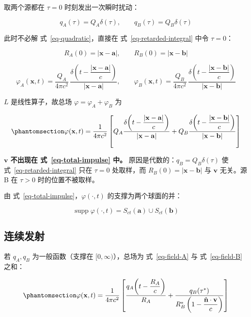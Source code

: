 \documentclass[
  chinese,
  a4paper,
  UTF8,
  12pt,
  oneside,
  openany]{ctexbook}
\theoremstyle{plain}
\theoremstyle{plain}
\theoremstyle{plain}
\theoremstyle{definition}
\theoremstyle{plain}
\theoremstyle{plain}
\theoremstyle{remark}
\begin{document}
取两个源都在 \(\tau=0\) 时刻发出一次瞬时扰动：

\[
q_{A}(\tau)=Q_{A}\delta(\tau),\qquad q_{B}(\tau)=Q_{B}\delta(\tau)
\]

此时不必解 式~\ref{eq-quadratic}，直接在 式~\ref{eq-retarded-integral}
中令 \(\tau=0\)：

\[
R_{A}(0)=|\mathbf{x}-\mathbf{a}|,\qquad R_{B}(0)=|\mathbf{x}-\mathbf{b}|
\]

\[
\varphi_{A}(\mathbf{x},t)=\frac{Q_{A}}{4\pi c^{2}}\,
\frac{\delta\!\left(t-\dfrac{|\mathbf{x}-\mathbf{a}|}{c}\right)}{|\mathbf{x}-\mathbf{a}|},
\qquad
\varphi_{B}(\mathbf{x},t)=\frac{Q_{B}}{4\pi c^{2}}\,
\frac{\delta\!\left(t-\dfrac{|\mathbf{x}-\mathbf{b}|}{c}\right)}{|\mathbf{x}-\mathbf{b}|}
\]

\(L\) 是线性算子，故总场 \(\varphi=\varphi_{A}+\varphi_{B}\) 为

\begin{equation}\protect\phantomsection\label{eq-total-impulse}{
\varphi(\mathbf{x},t)=\frac{1}{4\pi c^{2}}\left[
Q_{A}\frac{\delta\!\left(t-\dfrac{|\mathbf{x}-\mathbf{a}|}{c}\right)}{|\mathbf{x}-\mathbf{a}|}
+Q_{B}\frac{\delta\!\left(t-\dfrac{|\mathbf{x}-\mathbf{b}|}{c}\right)}{|\mathbf{x}-\mathbf{b}|}
\right]
}\end{equation}

\textbf{\(\mathbf{v}\) 不出现在 式~\ref{eq-total-impulse} 中。}
原因是代数的：\(q_{B}=Q_{B}\delta(\tau)\) 使
式~\ref{eq-retarded-integral} 只在 \(\tau=0\) 处取样，而
\(R_{B}(0)=|\mathbf{x}-\mathbf{b}|\) 与 \(\mathbf{v}\) 无关。源 B 在
\(\tau>0\) 时的位置不被取样。

由 式~\ref{eq-total-impulse}，\(\varphi(\cdot,t)\)
的支撑为两个球面的并：

\[
\operatorname{supp}\varphi(\cdot,t)=S_{ct}(\mathbf{a})\cup S_{ct}(\mathbf{b})
\]

\subsection{连续发射}\label{ux8fdeux7eedux53d1ux5c04}

若 \(q_{A},q_{B}\) 为一般函数（支撑在 \([0,\infty)\)），总场为
式~\ref{eq-field-A} 与 式~\ref{eq-field-B} 之和：

\begin{equation}\protect\phantomsection\label{eq-total-continuous}{
\varphi(\mathbf{x},t)=\frac{1}{4\pi c^{2}}\left[
\frac{q_{A}\!\left(t-\dfrac{R_{A}}{c}\right)}{R_{A}}
+\frac{q_{B}(\tau^{*})}{R_{B}^{*}\left(1-\dfrac{\hat{\mathbf{n}}\cdot\mathbf{v}}{c}\right)}
\right]
}\end{equation}
\end{document}
